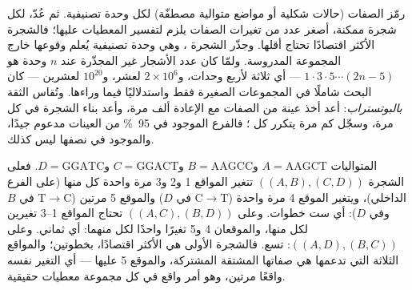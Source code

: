 \begin{method}[الاقتصاد]\label{meth:b2:phylogenetic-trees:parsimony}
رمّز الصفات (حالات شكلية أو مواضع متوالية مصطفّة)
لكل وحدة تصنيفية. ثم عُدّ، لكل شجرة ممكنة، أصغر
عدد من تغيرات الصفات يلزم لتفسير المعطيات
عليها؛ فالشجرة الأكثر اقتصادًا تحتاج أقلها. وجذّر الشجرة \emph{}، وهي وحدة تصنيفية يُعلم وقوعها خارج المجموعة المدروسة.
ولمّا كان عدد الأشجار غير المجذّرة عند $n$ وحدة هو $1\cdot 3\cdot
5\cdots(2n - 5)$ --- أي ثلاثة لأربع وحدات، و$2\times 10^{6}$ لعشر،
و$10^{20}$ لعشرين --- كان البحث شاملًا في المجموعات الصغيرة
فقط واستدلاليًا فيما وراءها. وتُقاس الثقة
\emph{بالبوتستراب}: أعد أخذ عينة من الصفات مع الإعادة
ألف مرة، وأعد بناء الشجرة في كل مرة، وسجّل كم مرة يتكرر
كل ؛ فالفرع الموجود في \qty{95}{\%} من العينات
مدعوم جيدًا، والموجود في نصفها ليس كذلك.
\end{method}

\begin{example}\label{ex:b2:phylogenetic-trees:parsimony}
المتواليات $A = \mathrm{AAGCT}$ و$B = \mathrm{AAGCC}$ و$C =
\mathrm{GGACT}$ و$D = \mathrm{GGATC}$. فعلى الشجرة $((A,B),(C,D))$
تتغير المواقع 1 و2 و3 مرة واحدة كل منها (على الفرع الداخلي)، ويتغير الموقع 4
مرة واحدة ($\mathrm{C}\to\mathrm{T}$ في $D$) والموقع 5 مرتين
($\mathrm{T}\to\mathrm{C}$ في $B$ وفي $D$): أي ست خطوات. وعلى
$((A,C),(B,D))$ تحتاج المواقع 1--3 تغيرين لكل منها، والموقعان 4 و5
تغيرًا واحدًا لكل منهما: أي ثماني. وعلى $((A,D),(B,C))$: تسع. فالشجرة الأولى هي الأكثر
اقتصادًا، بخطوتين؛ والمواقع الثلاثة التي تدعمها هي
صفاتها المشتقة المشتركة، والموقع 5  عليها --- أي التغير نفسه
واقعًا مرتين، وهو أمر واقع في كل مجموعة معطيات حقيقية.
\end{example}

